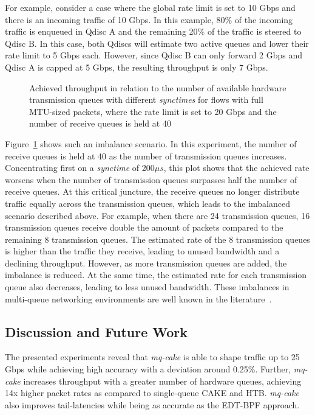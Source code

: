 For example, consider a case where the global rate limit is set to 10 Gbps and there is an incoming traffic of 10 Gbps.
%
In this example, 80\% of the incoming traffic is enqueued in Qdisc A and the remaining 20\% of the traffic is steered to Qdisc B. In this case, both Qdiscs will estimate two active queues and lower their rate limit to 5 Gbps each.
However, since Qdisc B can only forward 2 Gbps and Qdisc A is capped at 5 Gbps, the resulting throughput is only 7 Gbps.
%
\begin{figure}[t]
    \centering
    
    \caption{Achieved throughput in relation to the number of available hardware transmission queues with different \textit{synctimes} for flows with full MTU-sized packets, where the rate limit is set to 20 Gbps and the number of receive queues is held at 40}\label{fig:txq_imbalance_1514}
\end{figure}
Figure~\ref{fig:txq_imbalance_1514} shows such an imbalance scenario.
%
In this experiment, the number of receive queues is held at 40 as the number of transmission queues increases.
%
Concentrating first on a \textit{synctime} of 200$\mu s$, this plot shows that the achieved rate worsens when the number of transmission queues surpasses half the number of receive queues.
%
At this critical juncture, the receive queues no longer distribute traffic equally across the transmission queues, which leads to the imbalanced scenario described above.
%
For example, when there are 24 transmission queues, 16 transmission queues receive double the amount of packets compared to the remaining 8 transmission queues.
%
The estimated rate of the 8 transmission queues is higher than the traffic they receive, leading to unused bandwidth and a declining throughput.
%
However, as more transmission queues are added, the imbalance is reduced. At the same time, the estimated rate for each transmission queue also decreases, leading to less unused bandwidth. 
%
These imbalances in multi-queue networking environments are well known in the literature~\cite{titan, loom, silo}.
%

\subsection{Discussion and Future Work}
The presented experiments reveal that \textit{mq-cake} is able to shape traffic up to 25 Gbps while achieving high accuracy with a deviation around 0.25\%.
%
Further, \textit{mq-cake} increases throughput with a greater number of hardware queues, achieving 14x higher packet rates as compared to single-queue CAKE and HTB.
%
\textit{mq-cake} also improves tail-latencies while being as accurate as the EDT-BPF approach.

